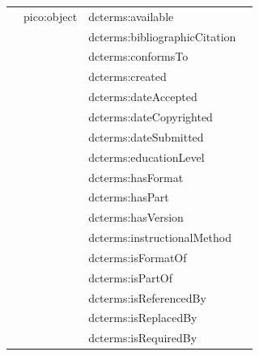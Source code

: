 \documentclass[epsfig,a4paper,12pt,titlepage]{book}
\begin{document}
\begin{center}
\begin{table}[h]
\begin{adjustbox}{width=\textwidth}
\begin{tabular}{|p{3.5cm}|p{3.5cm}|p{4.8cm}|p{3.8cm}|}
                     & pico:object          & dcterms:available             &                                 \\
                     &                      & dcterms:bibliographicCitation &                                 \\
                     &                      & dcterms:conformsTo            &                                 \\
                     &                      & dcterms:created               &                                 \\
                     &                      & dcterms:dateAccepted          &                                 \\
                     &                      & dcterms:dateCopyrighted       &                                 \\
                     &                      & dcterms:dateSubmitted         &                                 \\
                     &                      & dcterms:educationLevel        &                                 \\
                     &                      & dcterms:hasFormat             &                                 \\
                     &                      & dcterms:hasPart               &                                 \\
                     &                      & dcterms:hasVersion            &                                 \\
                     &                      & dcterms:instructionalMethod   &                                 \\
                     &                      & dcterms:isFormatOf            &                                 \\
                     &                      & dcterms:isPartOf              &                                 \\
                     &                      & dcterms:isReferencedBy        &                                 \\
                     &                      & dcterms:isReplacedBy          &                                 \\
                     &                      & dcterms:isRequiredBy          &                                 \\

\end{tabular}
\end{adjustbox}
\end{table}
\end{center}
\end{document}
